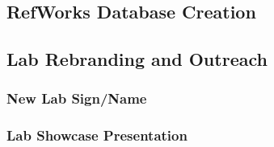 \subsection{RefWorks Database Creation\label{sec:methedology:pivoting:refWorksDatabaseCreation}}

\subsection{Lab Rebranding and Outreach\label{sec:methedology:pivoting:labRebrandingAndOutreach}}

\subsubsection{New Lab Sign/Name\label{sec:methedology:pivoting:labRebrandingAndOutreach:newLabSign}}

\subsubsection{Lab Showcase Presentation\label{sec:methedology:pivoting:labRebrandingAndOutreach:labShowcasePresentation}}

